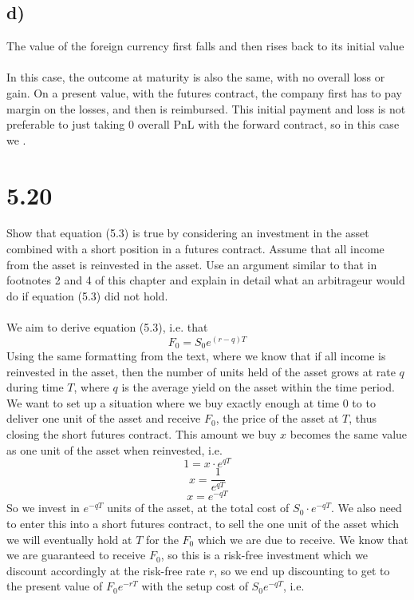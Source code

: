 \documentclass{article}
\begin{document}
{\subsection*{d)}
The value of the foreign currency first falls and then rises back to its initial value \\ \\
In this case, the outcome at maturity is also the same, with no overall loss or gain. On a present value, with the futures contract, the company first has to pay margin on the losses, and then is reimbursed. This initial payment and loss is not preferable to just taking 0 overall PnL with the forward contract, so in this case we .

}
{\Large 

\section*{5.20}
Show that equation (5.3) is true by considering an investment in the asset combined with a short position in a futures contract. Assume that all income from the asset is reinvested in the asset. Use an argument similar to that in footnotes 2 and 4 of this chapter and explain in detail what an arbitrageur would do if equation (5.3) did not hold. \\ \\
We aim to derive equation (5.3), i.e. that 
\[
  F_0 = S_0 e^{(r-q)T}
\]
Using the same formatting from the text, where we know that if all income is reinvested in the asset, then the number of units held of the asset grows at rate \(q\) during time \(T\), where \(q\) is the average yield on the asset within the time period. We want to set up a situation where we buy exactly enough at time 0 to to deliver one unit of the asset and receive \(F_0\), the price of the asset at \(T\), thus closing the short futures contract. This amount we buy \(x\) becomes the same value as one unit of the asset when reinvested, i.e. 
\[
  1 = x \cdot e^{qT}
\]
\[
  x = \frac{1}{e^{qT}}
\]
\[
  x = e^{-qT}
\]
So we invest in \(e^{-qT}\) units of the asset, at the total cost of \(S_0 \cdot e^{-qT}\). We also need to enter this into a short futures contract, to sell the one unit of the asset which we will eventually hold at \(T\) for the \(F_0\) which we are due to receive. We know that we are guaranteed to receive \(F_0\), so this is a risk-free investment which we discount accordingly at the risk-free rate \(r\), so we end up discounting to get to the present value of \(F_0e^{-rT}\) with the setup cost of \(S_0e^{-qT}\), i.e.
}
\end{document}

